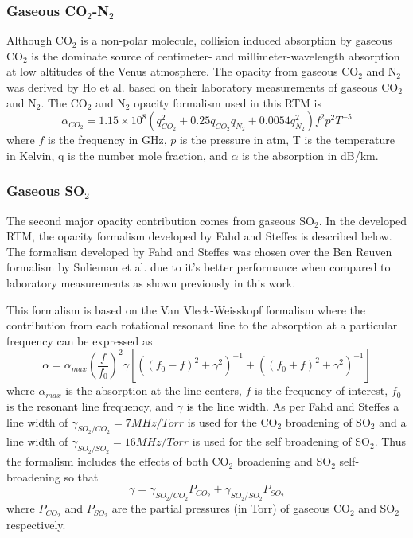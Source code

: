 \subsubsection{Gaseous CO$_2$-N$_2$}
Although CO$_2$ is a non-polar molecule, collision induced absorption by gaseous CO$_2$ \cite{Barrett-1960} is the dominate source of centimeter- and millimeter-wavelength absorption at low altitudes of the Venus atmosphere. The opacity from gaseous CO$_2$ and N$_2$  was derived by Ho et al. \cite{Ho-1966} based on their laboratory measurements of gaseous CO$_2$ and N$_2$. The CO$_2$ and N$_2$ opacity formalism used in this RTM is
\begin{equation}\label{eq:rtm-co2n2}
\alpha_{CO_2} = 1.15\times 10^8(q_{CO_2}^2 + 0.25q_{CO_2}q_{N_2} + 0.0054q_{N_2}^2)f^2p^2T^{-5}
\end{equation}
where $f$ is the frequency in GHz, $p$ is the pressure in atm, T is the temperature in Kelvin, q is the number mole fraction, and $\alpha$ is the absorption in dB/km.

\subsubsection{Gaseous SO$_2$}
The second major opacity contribution comes from gaseous SO$_2$. In the developed RTM, the opacity formalism developed by Fahd and Steffes \cite{Fahd-1991} is described below. The formalism developed by Fahd and Steffes was chosen over the Ben Reuven formalism by Sulieman et al. \cite{Suleiman-1996} due to it's better performance when compared to laboratory measurements as shown previously in this work.

This formalism is based on the Van Vleck-Weisskopf formalism where the contribution from each rotational resonant line to the absorption at a particular frequency can be expressed as 
\begin{equation}
\label{eq:rtm-so2fahd}
\alpha = \alpha_{max} \left(\frac{f}{f_0}\right)^2 \gamma [((f_0-f)^2+\gamma^2)^{-1}+((f_0+f)^2 + \gamma^2)^{-1}]
\end{equation}
where $\alpha_{max}$ is the absorption at the line centers, $f$ is the frequency of interest, $f_0$ is the resonant line frequency, and $\gamma$ is the line width. As per Fahd and Steffes \cite{Fahd-1991} a line width of $\gamma_{SO_2/CO_2} = 7MHz/Torr$ is used for the CO$_2$ broadening of SO$_2$ and a line width of $\gamma_{SO_2/SO_2} = 16MHz/Torr$ is used for the self broadening of SO$_2$. Thus the formalism includes the effects of both CO$_2$ broadening and SO$_2$ self-broadening so that
\begin{equation}
\gamma = \gamma_{SO_2/CO_2}P_{CO_2} + \gamma_{SO_2/SO_2}P_{SO_2}
\end{equation}
where $P_{CO_2}$ and $P_{SO_2}$ are the partial pressures (in Torr) of gaseous CO$_2$ and SO$_2$ respectively.

